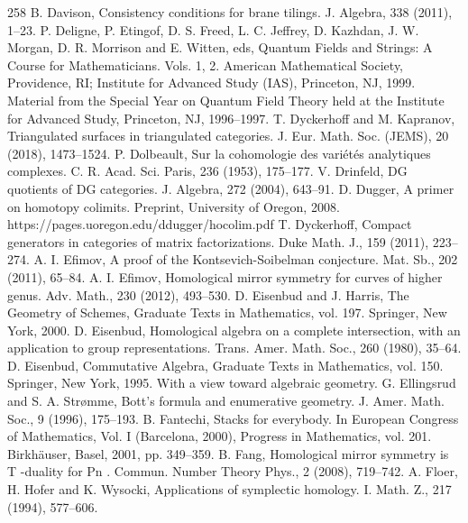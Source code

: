 \begin{thebibliography}{258}
\hypertarget{ref:63}{} B. Davison, Consistency conditions for brane tilings. J. Algebra, 338 (2011), 1–23.
\hypertarget{ref:64}{} P. Deligne, P. Etingof, D. S. Freed, L. C. Jeffrey, D. Kazhdan, J. W. Morgan, D. R. Morrison and E. Witten, eds, Quantum Fields and Strings: A Course for Mathematicians. Vols. 1, 2. American Mathematical Society, Providence, RI; Institute for Advanced Study (IAS), Princeton, NJ, 1999. Material from the Special Year on Quantum Field Theory held at the Institute for Advanced Study, Princeton, NJ, 1996–1997.
\hypertarget{ref:65}{} T. Dyckerhoff and M. Kapranov, Triangulated surfaces in triangulated categories. J. Eur. Math. Soc. (JEMS), 20 (2018), 1473–1524.
\hypertarget{ref:66}{} P. Dolbeault, Sur la cohomologie des variétés analytiques complexes. C. R. Acad. Sci. Paris, 236 (1953), 175–177.
\hypertarget{ref:67}{} V. Drinfeld, DG quotients of DG categories. J. Algebra, 272 (2004), 643–91.
\hypertarget{ref:68}{} D. Dugger, A primer on homotopy colimits. Preprint, University of Oregon, 2008. https://pages.uoregon.edu/ddugger/hocolim.pdf
\hypertarget{ref:69}{} T. Dyckerhoff, Compact generators in categories of matrix factorizations. Duke Math. J., 159 (2011), 223–274.
\hypertarget{ref:70}{} A. I. Efimov, A proof of the Kontsevich-Soibelman conjecture. Mat. Sb., 202 (2011), 65–84.
\hypertarget{ref:71}{} A. I. Efimov, Homological mirror symmetry for curves of higher genus. Adv. Math., 230 (2012), 493–530.
\hypertarget{ref:72}{} D. Eisenbud and J. Harris, The Geometry of Schemes, Graduate Texts in Mathematics, vol. 197. Springer, New York, 2000.
\hypertarget{ref:73}{} D. Eisenbud, Homological algebra on a complete intersection, with an application to group representations. Trans. Amer. Math. Soc., 260 (1980), 35–64.
\hypertarget{ref:74}{} D. Eisenbud, Commutative Algebra, Graduate Texts in Mathematics, vol. 150. Springer, New York, 1995. With a view toward algebraic geometry.
\hypertarget{ref:75}{} G. Ellingsrud and S. A. Strømme, Bott’s formula and enumerative geometry. J. Amer. Math. Soc., 9 (1996), 175–193.
\hypertarget{ref:76}{} B. Fantechi, Stacks for everybody. In European Congress of Mathematics, Vol. I (Barcelona, 2000), Progress in Mathematics, vol. 201. Birkhäuser, Basel, 2001, pp. 349–359.
\hypertarget{ref:77}{} B. Fang, Homological mirror symmetry is T -duality for Pn . Commun. Number Theory Phys., 2 (2008), 719–742.
\hypertarget{ref:78}{} A. Floer, H. Hofer and K. Wysocki, Applications of symplectic homology. I. Math. Z., 217 (1994), 577–606.

\end{thebibliography}
